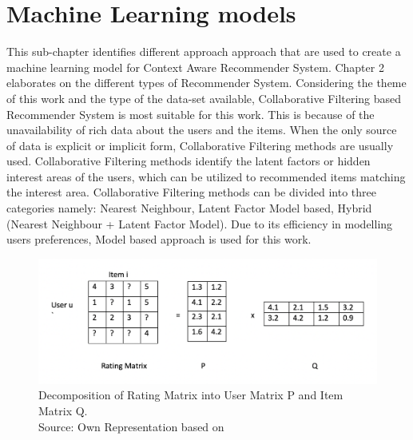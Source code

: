 \section{Machine Learning models}
This sub-chapter identifies different approach approach that are used to create a machine learning model for Context Aware Recommender System. Chapter 2 elaborates on the different types of Recommender System. Considering the theme of this work and the type of the data-set available, Collaborative Filtering based Recommender System is most suitable for this work. This is because of the unavailability of rich data about the users and the items. When the only source of data is explicit or implicit form, Collaborative Filtering methods are usually used. Collaborative Filtering methods identify the latent factors or hidden interest areas of the users, which can be utilized to recommended items matching the interest area. Collaborative Filtering methods can be divided into three categories namely: Nearest Neighbour, Latent Factor Model based, Hybrid (Nearest Neighbour + Latent Factor Model). Due to its efficiency in modelling users preferences, Model based approach is used for this work. \\
\Par

\begin{figure}
    \centering
    \includegraphics[scale=0.6]{chapters/figures/matrix_factorization.png}
    \caption{Decomposition of Rating Matrix into User Matrix P and Item Matrix Q.\\
    Source: Own Representation based on \textcite[44]{koren2009matrix}}
    \label{fig:matrix_factorization}
\end{figure}

